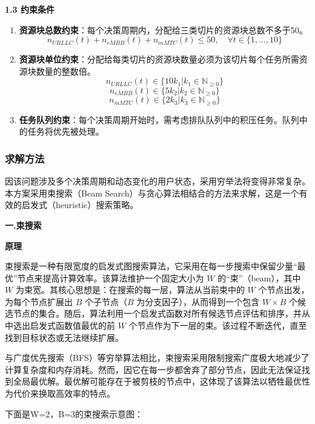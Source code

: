 \documentclass{ctexart}
\begin{document}
\textbf{1.3 约束条件}
\begin{enumerate}
 \item \textbf{资源块总数约束}：每个决策周期内，分配给三类切片的资源块总数不多于50。
 $$n_{URLLC}(t) + n_{eMBB}(t) + n_{mMTC}(t) \le 50, \quad \forall t \in \{1, \dots, 10\}$$
 \item \textbf{资源块单位约束}：分配给每类切片的资源块数量必须为该切片每个任务所需资源块数量的整数倍。
 $$n_{URLLC}(t) \in \{10k_1 | k_1 \in \mathbb{N}_{\ge 0}\} $$
 $$n_{eMBB}(t) \in \{5k_2 | k_2 \in \mathbb{N}_{\ge 0}\} $$
 $$n_{mMTC}(t) \in \{2k_3 | k_3 \in \mathbb{N}_{\ge 0}\} $$
 
 \item \textbf{任务队列约束}：每个决策周期开始时，需考虑排队队列中的积压任务。队列中的任务将优先被处理。
\end{enumerate}

\subsubsection{求解方法}
因该问题涉及多个决策周期和动态变化的用户状态，采用穷举法将变得非常复杂。本方案采用束搜索（Beam Search）与贪心算法相结合的方法来求解，这是一个有效的启发式（heuristic）搜索策略。

\textbf{一.束搜索}

 \textbf{原理}

束搜索是一种有限宽度的启发式图搜索算法，它采用在每一步搜索中保留少量“最优”节点来提高计算效率。该算法维护一个固定大小为 $W$ 的“束”（beam），其中 $W$ 为束宽。其核心思想是：在搜索的每一层，算法从当前束中的 $W$ 个节点出发，为每个节点扩展出 $B$ 个子节点（$B$ 为分支因子），从而得到一个包含 $W \times B$ 个候选节点的集合。随后，算法利用一个启发式函数对所有候选节点评估和排序，并从中选出启发式函数值最优的前 $W$ 个节点作为下一层的束。该过程不断迭代，直至找到目标状态或无法继续扩展。

与广度优先搜索（BFS）等穷举算法相比，束搜索采用限制搜索广度极大地减少了计算复杂度和内存消耗。然而，因它在每一步都舍弃了部分节点，因此无法保证找到全局最优解。最优解可能存在于被剪枝的节点中，这体现了该算法以牺牲最优性为代价来换取高效率的特点。



下面是W=2，B=3的束搜索示意图：
\end{document}
